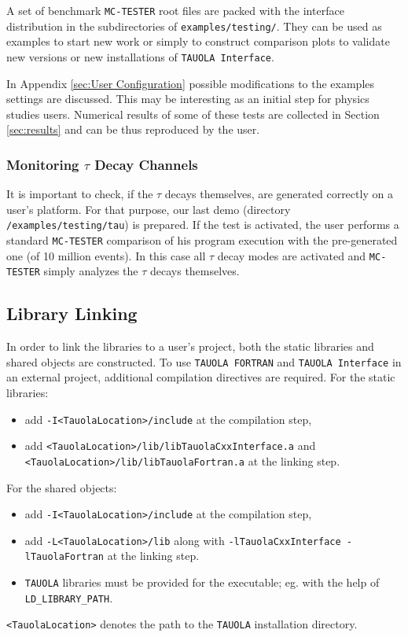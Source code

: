 \documentclass[]{Tauola_interface_design}
\begin{document}
A set of benchmark {\tt MC-TESTER} root files are packed with the interface
distribution in the subdirectories of {\tt examples/testing/}. They can be used
as examples to start new work or simply to construct comparison
plots to validate new versions or new installations of {\tt TAUOLA Interface}. 


In Appendix \ref{sec:User Configuration} possible  modifications to the  
examples settings 
are discussed. This may be interesting as an initial step for 
physics studies users.  Numerical results of some of these tests
are collected in Section \ref{sec:results}
and can be thus reproduced by the user.


\subsubsection{Monitoring $\tau$ Decay  Channels}

It is important to check, if  the $\tau$ decays themselves,
are generated correctly on a user's platform.
For that purpose, our last demo (directory {\tt /examples/testing/tau}) is prepared.  If the test is activated,
the user performs
a standard {\tt MC-TESTER} comparison of his program execution with the  pre-generated one (of 10 million events).
In this case all $\tau$ decay modes are activated and {\tt MC-TESTER} simply
analyzes the $\tau$ decays themselves.


\subsection{Library Linking}
In order to link the libraries to a user's project, both the static libraries and shared objects are
constructed. To use {\tt TAUOLA FORTRAN} and {\tt TAUOLA Interface} in an external project, additional 
compilation directives are required. For the static libraries:
\begin{itemize}
  \item add {\tt -I<TauolaLocation>/include} at the compilation step,
  \item add {\tt <TauolaLocation>/lib/libTauolaCxxInterface.a} and \\ {\tt <TauolaLocation>/lib/libTauolaFortran.a} at the linking step.
\end{itemize}
For the shared objects:
\begin{itemize}
  \item add {\tt -I<TauolaLocation>/include} at the compilation step,
  \item add {\tt -L<TauolaLocation>/lib} along with {\tt -lTauolaCxxInterface -lTauolaFortran} at the linking step.
  \item  {\tt TAUOLA} libraries must be provided for the executable; eg. with the help of  {\tt LD\_LIBRARY\_PATH}.
\end{itemize}
{\tt <TauolaLocation>} denotes the  path to the {\tt TAUOLA} installation directory. 
\end{document}
